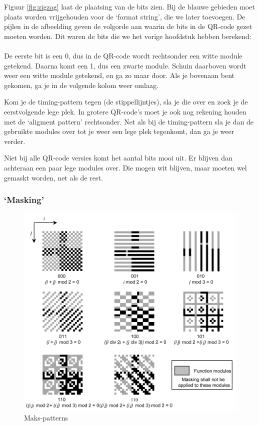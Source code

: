 \documentclass[a4paper]{article}
\begin{document}
Figuur \ref{fig:zigzag} laat de plaatsing van de bits zien. Bij de blauwe gebieden moet plaats worden vrijgehouden voor de `format string', die we later toevoegen. De pijlen in de afbeelding geven de volgorde aan waarin de bits in de QR-code gezet moeten worden. Dit waren de bits die we het vorige hoofdstuk hebben berekend:\\\\
De eerste bit is een 0, dus in de QR-code wordt rechtsonder een witte module getekend. Daarna komt een 1, dus een zwarte module. Schuin daarboven wordt weer een witte module getekend, en ga zo maar door. Als je bovenaan bent gekomen, ga je in de volgende kolom weer omlaag.

Kom je de timing-pattern tegen (de stippellijntjes), sla je die over en zoek je de eerstvolgende lege plek. In grotere QR-code's moet je ook nog rekening houden met de `aligment pattern'  rechtsonder. Net als bij de timing-pattern sla je dan de gebruikte modules over tot je weer een lege plek tegenkomt, dan ga je weer verder.

Niet bij alle QR-code versies komt het aantal bits mooi uit. Er blijven dan achteraan een paar lege modules over. Die mogen wit blijven, maar moeten wel gemaskt worden, net als de rest.

\subsubsection{`Masking'}
\begin{figure}[!htbp]
\centering
\includegraphics[width=0.8\linewidth]{mask-patterns.png}
\caption[Mask-patterns]{Maks-patterns\footnotemark}
\label{fig:mask-patterns}
\end{figure}
\end{document}
